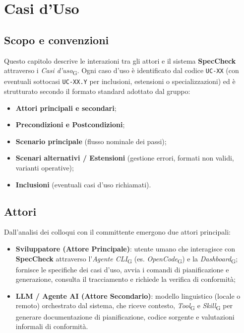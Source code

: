 \documentclass[11pt, a4paper]{article}
\newcommand{\glossario}[1]{\textit{#1}\textsubscript{G}}
\begin{document}
\section{Casi d'Uso}

\subsection{Scopo e convenzioni}
Questo capitolo descrive le interazioni tra gli attori e il sistema \textbf{SpecCheck} attraverso i \glossario{Casi d'uso}. Ogni caso d'uso è identificato dal codice \texttt{UC-XX} (con eventuali sottocasi \texttt{UC-XX.Y} per inclusioni, estensioni o specializzazioni) ed è strutturato secondo il formato standard adottato dal gruppo:
\begin{itemize}
    \item \textbf{Attori principali e secondari};
    \item \textbf{Precondizioni e Postcondizioni};
    \item \textbf{Scenario principale} (flusso nominale dei passi);
    \item \textbf{Scenari alternativi / Estensioni} (gestione errori, formati non validi, varianti operative);
    \item \textbf{Inclusioni} (eventuali casi d'uso richiamati).
\end{itemize}

\subsection{Attori}
Dall'analisi dei colloqui con il committente emergono due attori principali:
\begin{itemize}
    \item \textbf{Sviluppatore (Attore Principale)}: utente umano che interagisce con \textbf{SpecCheck} attraverso l'\glossario{Agente CLI} (es. \glossario{OpenCode}) e la \glossario{Dashboard}; fornisce le specifiche dei casi d'uso, avvia i comandi di pianificazione e generazione, consulta il tracciamento e richiede la verifica di conformità;
    \item \textbf{LLM / Agente AI (Attore Secondario)}: modello linguistico (locale o remoto) orchestrato dal sistema, che riceve contesto, \glossario{Tool} e \glossario{Skill} per generare documentazione di pianificazione, codice sorgente e valutazioni informali di conformità.
\end{itemize}
\end{document}
